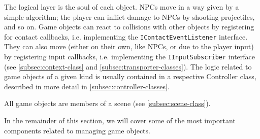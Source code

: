 The logical layer is the soul of each object.
NPCs move in a way given by a simple algorithm;
the player can inflict damage to NPCs by shooting projectiles, and so on.
Game objects can react to collisions with other objects by registering for contact callbacks, i.e. implementing the \texttt{IContactEventListener} interface.
They can also move (either on their own, like NPCs, or due to the player input) by registering input callbacks, i.e. implementing the \texttt{IInputSubscriber} interface (see \autoref{subsec:context-class} and \autoref{subsec:transporter-classes}).
The logic related to game objects of a given kind is usually contained in a respective Controller class, described in more detail in \autoref{subsec:controller-classes}.

All game objects are members of a scene (see \autoref{subsec:scene-class}).

In the remainder of this section, we will cover some of the most important components related to managing game objects.






